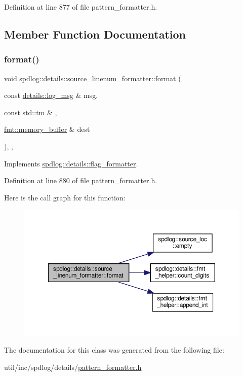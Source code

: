 Definition at line 877 of file pattern\+\_\+formatter.\+h.



\subsection{Member Function Documentation}
\mbox{\label{classspdlog_1_1details_1_1source__linenum__formatter_ac165ced330bd04ea5485e182b9d913a2}} 
\subsubsection{\texorpdfstring{format()}{format()}}
{\footnotesize\ttfamily void spdlog\+::details\+::source\+\_\+linenum\+\_\+formatter\+::format (\begin{DoxyParamCaption}\item[{const \hyperlink{structspdlog_1_1details_1_1log__msg}{details\+::log\+\_\+msg} \&}]{msg,  }\item[{const std\+::tm \&}]{,  }\item[{\hyperlink{format_8h_a21cbf729f69302f578e6db21c5e9e0d2}{fmt\+::memory\+\_\+buffer} \&}]{dest }\end{DoxyParamCaption})\hspace{0.3cm}{\ttfamily [inline]}, {\ttfamily [override]}, {\ttfamily [virtual]}}



Implements \hyperlink{classspdlog_1_1details_1_1flag__formatter_a33fb3e42a4c8200cceb833d92b53fb67}{spdlog\+::details\+::flag\+\_\+formatter}.



Definition at line 880 of file pattern\+\_\+formatter.\+h.

Here is the call graph for this function\+:
\nopagebreak
\begin{figure}[H]
\begin{center}
\leavevmode
\includegraphics[width=350pt]{classspdlog_1_1details_1_1source__linenum__formatter_ac165ced330bd04ea5485e182b9d913a2_cgraph}
\end{center}
\end{figure}


The documentation for this class was generated from the following file\+:\begin{DoxyCompactItemize}
\item 
util/inc/spdlog/details/\hyperlink{pattern__formatter_8h}{pattern\+\_\+formatter.\+h}\end{DoxyCompactItemize}
